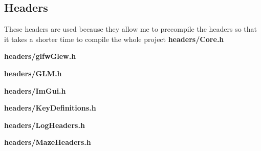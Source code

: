 \documentclass[../Main.tex]{subfiles}
\begin{document}
    \subsection{Headers}
        These headers are used because they allow me to precompile the headers so that it takes a shorter time to compile the whole project
        \textbf{headers/Core.h}
        
        \textbf{headers/glfwGlew.h}
        
        \textbf{headers/GLM.h}
        
        \textbf{headers/ImGui.h}
        
        \textbf{headers/KeyDefinitions.h}
        
        \textbf{headers/LogHeaders.h}
        
        \textbf{headers/MazeHeaders.h}
        
\end{document}
